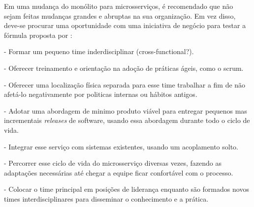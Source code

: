 Em uma mudança do monólito para microsserviços, é recomendado que não sejam feitas mudanças grandes e abruptas na sua organização. Em vez disso, deve-se procurar uma oportunidade com uma iniciativa de negócio para testar a fórmula proposta por  : 

- Formar um pequeno time inderdisciplinar (cross-functional?).

- Oferecer treinamento e orientação na adoção de práticas ágeis, como o scrum.

- Oferecer uma localização física separada para esse time trabalhar a fim de não afetá-lo negativamente por politicas internas ou hábitos antigos.

- Adotar uma abordagem de minimo produto viável para entregar pequenos mas incrementais \emph{releases} de software, usando essa abordagem durante todo o ciclo de vida.

- Integrar esse serviço com sistemas existentes, usando um acoplamento solto.

- Percorrer esse ciclo de vida do microsserviço diversas vezes, fazendo as adaptações necessárias até chegar a equipe ficar confortável com o processo.

- Colocar o time principal em posições de liderança enquanto são formados novos times interdisciplinares para disseminar o conhecimento e a prática.